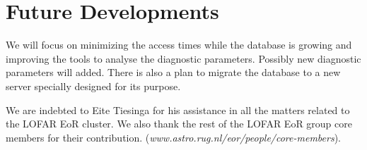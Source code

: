 \section{Future Developments}
We will focus on minimizing the access times while the database is growing and improving the tools to analyse the diagnostic parameters. Possibly new diagnostic parameters will added. There is also a plan to migrate the database to a new server specially designed for its purpose. 

\acknowledgements We are indebted to Eite Tiesinga for his assistance in all the matters related to the LOFAR EoR cluster. We also thank the rest of the LOFAR EoR group core members for their contribution. (\textit{www.astro.rug.nl/eor/people/core-members}).
